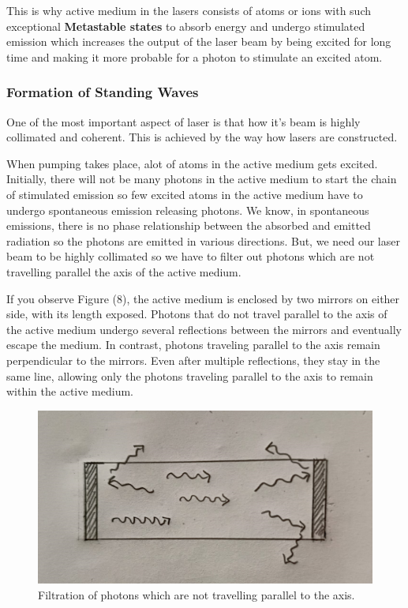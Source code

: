 \documentclass[12pt]{article}
\begin{document}
This is why active medium in the lasers consists of atoms or ions with such exceptional \textbf{Metastable states} to absorb energy and undergo stimulated emission which increases the output of the laser beam by being excited for long time and making it more probable for a photon to stimulate an excited atom.

\subsubsection{Formation of Standing Waves}

One of the most important aspect of laser is that how it's beam is highly collimated and coherent. This is achieved by the way how lasers are constructed. \vspace{.2cm}

When pumping takes place, alot of atoms in the active medium gets excited. Initially, there will not be many photons in the active medium to start the chain of stimulated emission so few excited atoms in the active medium have to undergo spontaneous emission releasing photons. We know, in spontaneous emissions, there is no phase relationship between the absorbed and emitted radiation so the photons are emitted in various directions. But, we need our laser beam to be highly collimated so we have to filter out photons which are not travelling parallel the axis of the active medium. \vspace{.2cm}

If you observe Figure (8), the active medium is enclosed by two mirrors on either side, with its length exposed. Photons that do not travel parallel to the axis of the active medium undergo several reflections between the mirrors and eventually escape the medium. In contrast, photons traveling parallel to the axis remain perpendicular to the mirrors. Even after multiple reflections, they stay in the same line, allowing only the photons traveling parallel to the axis to remain within the active medium.

\begin{figure}[H]
    \centering
    \includegraphics[scale=.6]{./img/12_filtration.png}
    \caption{Filtration of photons which are not travelling parallel to the axis.}
\end{figure}
\end{document}
